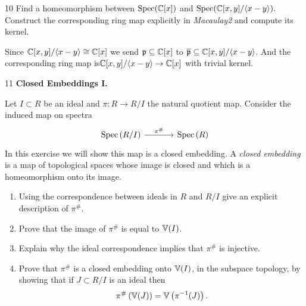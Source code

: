 \documentclass[Notebook.tex]{subfiles}
\begin{document}
\vspace{.2in}

\begin{problem}{10}
     Find a homeomorphism between  $\operatorname{Spec}(\mathbb C[x])$ and  $\operatorname{Spec}(\mathbb C[x,y] /\langle x-y \rangle).$ Construct the corresponding ring map explicitly in \textit{Macaulay2} and compute its kernel.

\end{problem}

\begin{solution}
    \bbni 
    Since $\mathbb C[x,y] /\langle x-y \rangle \cong \mathbb C[x]$ we send $\operatorname{\mathfrak{p}} \subseteq \mathbb C[x]$  to $\overline{ \operatorname{\mathfrak{p}}} \subseteq \mathbb C[x,y] /\langle x-y \rangle$. And the corresponding ring map is$ \mathbb C[x,y] /\langle x-y \rangle \to \mathbb C[x]$ with trivial kernel. 
\end{solution}

\newpage 


\begin{problem}{11}
    \textbf{Closed Embeddings I.}  
    
    Let $I \subset R$ be an ideal and $\pi: R \to R/I$ the natural quotient map. Consider the induced map on spectra
    \[
    \begin{tikzcd}[row sep = .5em, column sep = 3.5em]
    \Spec\left(R/I\right) \arrow[r, "\pi^{\#}"] & \Spec\left(R\right) 
    \end{tikzcd}
    \]
    In this exercise we will show this map is a closed embedding. A \emph{closed embedding} is a map of topological spaces whose image is closed and which is a homeomorphism onto its image.
    \begin{enumerate}[label=(\alph*),ref=\theenumi\alph*]
        \item Using the correspondence between ideals in $R$ and $R/I$ give an explicit description of $\pi^{\#}$.
        \item Prove that the image of $\pi^{\#}$ is equal to $\mathbb V(I)$. 
        \item Explain why the ideal correspondence implies that $\pi^{\#}$ is injective. 
        \item Prove that $\pi^{\#}$ is a closed embedding onto $\mathbb V(I)$, in the subspace topology, by showing that if $J \subset R/I$ is an ideal then
        \[
        \pi^{\#}\left(\mathbb V(J)\right) = \mathbb V\left(\pi^{-1}(J)\right). 
        \]
    \end{enumerate}
\end{problem}
\end{document}
